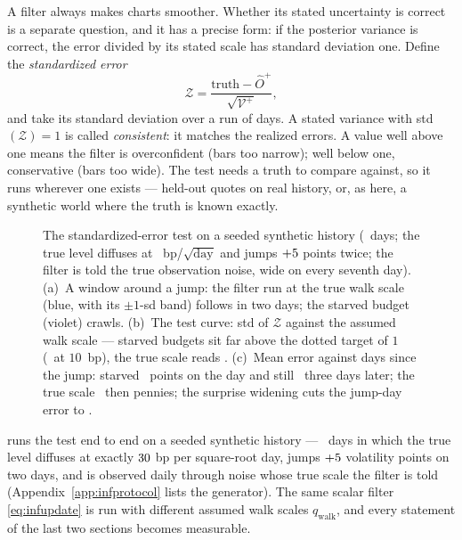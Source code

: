 A filter always makes charts smoother.  Whether its stated
uncertainty is correct is a separate question, and it has a precise
form: if the posterior variance is correct, the error divided by
its stated scale has standard deviation one.  Define the
\emph{standardized error}
\begin{equation}
\mathcal{Z}
=\frac{\text{truth}-\hat O^{+}}{\sqrt{\mathcal{V}^{+}}},
\label{eq:infz}
\end{equation}
and take its standard deviation over a run of days.  A stated
variance with std$(\mathcal{Z})=1$ is called \emph{consistent}:
it matches the realized errors.  A value well above one
means the filter is overconfident (bars too narrow); well below
one, conservative (bars too wide).  The test needs a truth to
compare against, so it runs wherever one exists --- held-out quotes
on real history, or, as here, a synthetic world where the truth is
known exactly.

\begin{figure}[htbp]
\centering
{}
\caption{The standardized-error test on a seeded synthetic history
(\MacFiltAuditDays\ days; the true level diffuses at
\MacFiltAuditQTrueBp\ bp/$\sqrt{\text{day}}$ and jumps
$+5$ points twice; the filter is told the true
observation noise, wide on every seventh day).  (a)~A window around
a jump: the filter run at the true walk scale (blue, with its
$\pm1$-sd band) follows in two days; the starved budget (violet)
crawls.  (b)~The test curve: std of $\mathcal{Z}$ against the
assumed walk scale --- starved budgets sit far above the dotted
target of $1$ (\MacFiltAuditZstdStarved\ at $10$~bp), the true
scale reads \MacFiltAuditZstdHonest.  (c)~Mean error against days
since the jump: starved \MacFiltAuditDayZeroStarved\ points on the
day and still \MacFiltAuditDayThreeStarved\ three days later; the
true scale \MacFiltAuditDayZeroHonest\ then pennies; the surprise
widening cuts the jump-day error to \MacFiltAuditDayZeroGate.}
\label{fig:infaudit}
\end{figure}

 runs the test end to end on a seeded synthetic
history --- \MacFiltAuditDays\ days in which the true level
diffuses at exactly $30$ bp per square-root day,
jumps $+5$ volatility points on two days, and is
observed daily through noise whose true scale the filter is told
(Appendix~\ref{app:infprotocol} lists the generator).  The same
scalar filter \cref{eq:infupdate} is run with different assumed walk
scales $q_{\mathrm{walk}}$, and every statement of the last two
sections becomes measurable.

